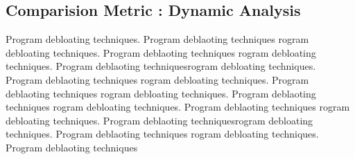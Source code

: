 \documentclass{relatorio}
\begin{document}
\subsection{Comparision Metric : Dynamic Analysis}%
\label{Tools}

Program debloating techniques. Program deblaoting techniques rogram debloating techniques. Program deblaoting techniques
rogram debloating techniques. Program deblaoting techniquesrogram debloating techniques. Program deblaoting techniques
rogram debloating techniques. Program deblaoting techniques rogram debloating techniques. Program deblaoting techniques
rogram debloating techniques. Program deblaoting techniques 
rogram debloating techniques. Program deblaoting techniquesrogram debloating techniques. Program deblaoting techniques
rogram debloating techniques. Program deblaoting techniques
\end{document}
